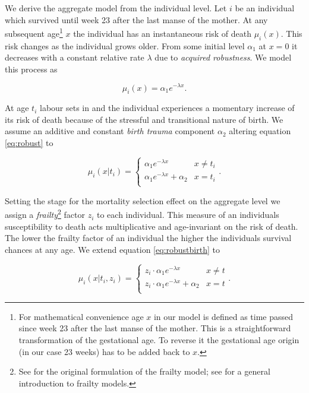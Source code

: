 \documentclass[12pt, parskip=half]{scrartcl}
\begin{document}
We derive the aggregate model from the individual level. Let $i$ be an individual which survived until week 23 after the last manse of the mother. At any subsequent age\footnote{For mathematical convenience age $x$ in our model is defined as time passed since week 23 after the last manse of the mother. This is a straightforward transformation of the gestational age. To reverse it the gestational age origin (in our case 23 weeks) has to be added back to $x$.} $x$ the individual has an instantaneous risk of death $\mu_i(x)$. This risk changes as the individual grows older. From some initial level $\alpha_1$ at $x = 0$ it decreases with a constant relative rate $\lambda$ due to \emph{acquired robustness}. We model this process as

\begin{equation}
  \mu_i(x) = \alpha_1 e^{-\lambda x}.
  \label{eq:robust}
\end{equation}

At age $t_i$ labour sets in and the individual experiences a momentary increase of its risk of death because of the stressful and transitional nature of birth. We assume an additive and constant \emph{birth trauma} component $\alpha_2$ altering equation \ref{eq:robust} to

\begin{equation}
  \mu_i(x|t_i) =
  \begin{cases}
    \alpha_1 e^{-\lambda x} & x \neq t_i \\
    \alpha_1 e^{-\lambda x} + \alpha_2 & x = t_i \\
  \end{cases}.
  \label{eq:robustbirth}
\end{equation}

Setting the stage for the mortality selection effect on the aggregate level we assign a \emph{frailty}\footnote{See \cite{Vaupel1979} for the original formulation of the frailty model; see \cite{Wienke2011} for a general introduction to frailty models.} factor $z_i$ to each individual. This measure of an individuals susceptibility to death acts multiplicative and age-invariant on the risk of death. The lower the frailty factor of an individual the higher the individuals survival chances at any age. We extend equation \ref{eq:robustbirth} to

\begin{equation}
  \mu_i(x|t_i,z_i) =
  \begin{cases}
    z_i \cdot \alpha_1 e^{-\lambda x} & x \neq t \\
    z_i \cdot \alpha_1 e^{-\lambda x} + \alpha_2 & x = t \\
  \end{cases}.
  \label{eq:indhzrd}
\end{equation}
\end{document}
